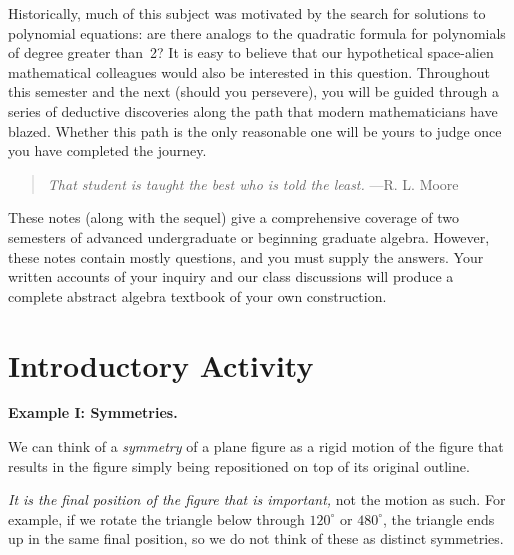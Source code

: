 Historically, much of this subject was motivated by the search for solutions to polynomial equations: are there analogs to the quadratic formula for polynomials of degree greater than~2? It is easy to believe that our hypothetical space-alien mathematical colleagues would also be interested in this question. Throughout this semester and the next (should you persevere), you will be guided through a series of deductive discoveries along the path that modern mathematicians have blazed. Whether this path is the only reasonable one will be yours to judge once you have completed the journey.

\begin{quote}
  \textit{That student is taught the best who is told the least.} ---R. L. Moore
\end{quote}

These notes (along with the sequel) give a comprehensive coverage of two semesters of advanced undergraduate or beginning graduate algebra. However, these notes contain mostly questions, and you must supply the answers. Your written accounts of your inquiry and our class discussions will produce a complete abstract algebra textbook of your own construction.

\mainmatter

\chapter*{Introductory Activity}

\textbf{Example I: Symmetries.}
\begin{annotation}
\end{annotation}

We can think of a \textit{symmetry} of a plane figure as a rigid motion of the figure that results in the figure simply being repositioned on top of its original outline.

\textit{It is the final position of the figure that is important,} not the motion as such. For example, if we rotate the triangle below through $120^\circ$ or $480^\circ$, the triangle ends up in the same final position, so we do not think of these as distinct symmetries.

